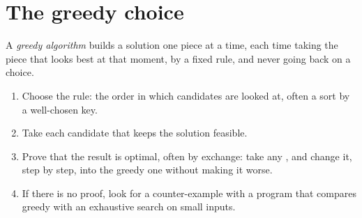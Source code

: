 \label{lst:g11:greedy-algorithms:exhaustive}

\label{out:g11:greedy-algorithms:exhaustive}

\section{The greedy choice}\label{sec:g11:greedy-algorithms:greedy}

\begin{definition}\label{def:g11:greedy-algorithms:greedy}
A \emph{greedy algorithm} builds a solution one piece at a time, each time taking the piece
that looks best at that moment, by a fixed rule, and never going back on a choice.
\end{definition}

\begin{method}
\begin{enumerate}
  \item Choose the rule: the order in which candidates are looked at, often a sort by a well-chosen key.
  \item Take each candidate that keeps the solution feasible.
  \item Prove that the result is optimal, often by exchange: take any , and change it, step by step,
    into the greedy one without making it worse.
  \item If there is no proof, look for a counter-example with a program that compares greedy with an exhaustive
    search on small inputs.
\end{enumerate}
\end{method}

\label{lst:g11:greedy-algorithms:change-greedy}

\label{out:g11:greedy-algorithms:change-greedy}

